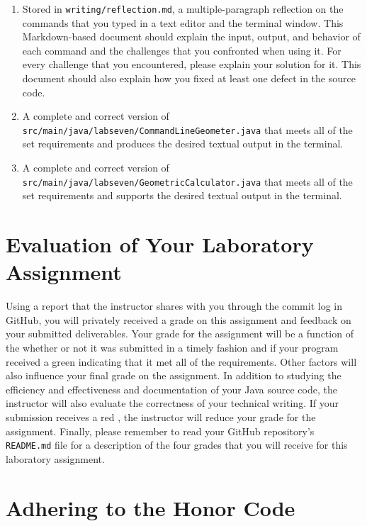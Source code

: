 \documentclass[11pt]{article}
\newcommand{\mainprogramsource}{\lstinline{src/main/java/labseven/CommandLineGeometer.java}}
\newcommand{\secondprogramsource}{\lstinline{src/main/java/labseven/GeometricCalculator.java}}
\newcommand{\reflection}{\lstinline{writing/reflection.md}}
\newcommand{\program}[1]{\lstinline{#1}}
\newcommand{\checkmark}{\ding{51}}
\newcommand{\naughtmark}{\ding{55}}
\begin{document}
\begin{enumerate}

  \setlength{\itemsep}{0in}

\item Stored in \reflection{}, a multiple-paragraph reflection on the commands
  that you typed in a text editor and the terminal window. This Markdown-based
  document should explain the input, output, and behavior of each command and
  the challenges that you confronted when using it. For every challenge that you
  encountered, please explain your solution for it. This document should also
  explain how you fixed at least one defect in the source code.

\item A complete and correct version of \mainprogramsource{} that meets all of
  the set requirements and produces the desired textual output in the terminal.

\item A complete and correct version of \secondprogramsource{} that meets all of
  the set requirements and supports the desired textual output in the terminal.

\end{enumerate}

\section*{Evaluation of Your Laboratory Assignment}

Using a report that the instructor shares with you through the commit log in
GitHub, you will privately received a grade on this assignment and feedback on
your submitted deliverables. Your grade for the assignment will be a function of
the whether or not it was submitted in a timely fashion and if your program
received a green \checkmark{} indicating that it met all of the requirements.
Other factors will also influence your final grade on the assignment. In
addition to studying the efficiency and effectiveness and documentation of your
Java source code, the instructor will also evaluate the correctness of your
technical writing. If your submission receives a red \naughtmark{}, the
instructor will reduce your grade for the assignment. Finally, please remember
to read your GitHub repository's \program{README.md} file for a description of
the four grades that you will receive for this laboratory assignment.

\section*{Adhering to the Honor Code}
\end{document}
